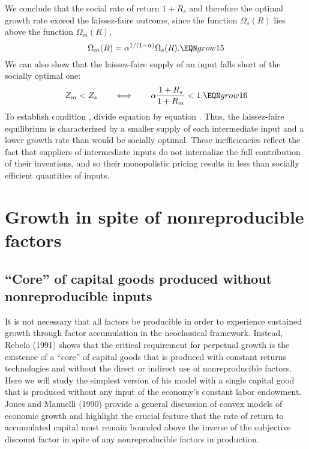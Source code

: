 We conclude that the social rate of return $1+R_s$ and
therefore the optimal growth rate exceed the laissez-faire
outcome, since the function $\Omega_s(R)$ lies above the function
$\Omega_m(R)$,
$$
\Omega_m(R) = \alpha^{1/(1-\alpha)} \Omega_s(R).           \EQN grow15
$$
We can also show that the laissez-faire supply of an input falls
short of the socially optimal one:
$$
Z_m < Z_s \qquad \Longleftrightarrow \qquad \alpha {1+R_s \over 1+R_m} <
1. \EQN grow16
$$
To establish condition , divide equation  by equation .
 Thus, the laissez-faire equilibrium
is characterized by a smaller supply of each intermediate input
and a lower growth rate than would be socially optimal. These
inefficiencies reflect the fact that suppliers of intermediate inputs do not
internalize the full contribution of their inventions, and so their
monopolistic pricing results in less than socially efficient quantities
of inputs.


\section{Growth in spite of nonreproducible factors}

\subsection{``Core'' of capital goods produced without nonreproducible inputs}
It is not necessary that all factors be producible in order to experience
sustained growth through factor accumulation in the neoclassical framework.
Instead, Rebelo (1991)
%
shows that the critical requirement for perpetual
growth is the existence of a ``core'' of capital goods that is produced
with constant returns technologies and without the direct or indirect use
of nonreproducible factors. Here we will study the simplest version of
his model with a single capital good that is produced without any input
of the economy's constant labor endowment. Jones and Manuelli (1990)
%
provide a general discussion of convex models of economic growth
and highlight the crucial feature that the rate of return to
accumulated capital must remain bounded above the inverse of the
subjective discount factor in spite of any nonreproducible factors
in production.

